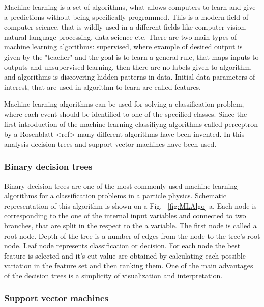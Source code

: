 Machine learning is a set of algorithms, what allows computers to learn and give a predictions without being specifically programmed. This is a modern field of computer science, that is wildly used in a different fields like computer vision, natural language processing, data science etc. There are two main types of machine learning algorithms: supervised, where example of desired output is given by the "teacher" and the goal is to learn a general rule, that maps inputs to outputs and unsupervised learning, then there are no labels given to algorithm, and algorithms is discovering hidden patterns in data. Initial data parameters of interest, that are used in algorithm to learn are called features. 

Machine learning algorithms can be used for solving a classification problem, where each event should be identified to one of the specified classes. Since the first introduction of the machine learning classifiyng algorithms called perceptron by a Rosenblatt <ref> many different algorithms have been invented. In this analysis decision trees and support vector machines have been used.

\subsubsection{Binary decision trees}

Binary decision trees are one of the most commonly used machine learning algorithms for a classification problems in a particle physics. Schematic representation of this algorithm is shown on a Fig. ~\ref{fig:MLAlgo} a. Each node is corresponding to the one of the internal input variables and connected to two branches, that are split in the respect to the a variable. The first node is called a root node. Depth of the tree is a number of edges from the node to the tree's root node. Leaf node represents classification or decision.
 For each node the best feature is selected and it's cut value are obtained by calculating each possible variation in the feature set and then ranking them. One of the main advantages of the decision trees is a simplicity of visualization and interpretation. 

\subsubsection{Support vector machines}

